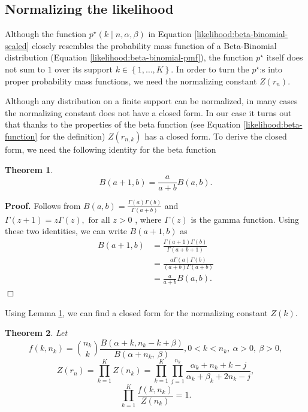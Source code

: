 \documentclass[officiallayout]{tktla}
\newtheorem{theorem}{Theorem}[chapter]
\newenvironment{proof}{\noindent\textbf{Proof.} }{$\Box$}
\begin{document}
\subsection{Normalizing the likelihood}

Although the function $p^{\star}\left(k \middle| n, \alpha,
\beta\right)$ in Equation \ref{likelihood:beta-binomial-scaled}
closely resembles the probability mass function of a Beta-Binomial
distribution (Equation \ref{likelihood:beta-binomial-pmf}), the
function $p^{\star}$ itself does not sum to $1$ over its support $k
\in \left\{ 1, \dots, K \right\}$. In order to turn the $p^{\star}$:s
into proper probability mass functions, we need the normalizing
constant $Z\left(r_{n}\right)$.

Although any distribution on a finite support can be normalized, in
many cases the normalizing constant does not have a closed form. In
our case it turns out that \textemdash thanks to the properties of the
beta function (see Equation \ref{likelihood:beta-function} for the
definition) \textemdash $Z\left(r_{n, k}\right)$ has a closed form. To
derive the closed form, we need the following identity for the beta
function
\begin{theorem}
  \label{lemma:beta-function-identity}
  \[
  B\left(a + 1, b\right) = \frac{a}{a + b}B\left(a, b\right).
  \]
\end{theorem}

\begin{proof}
  Follows from $B\left(a, b\right) = \frac{\Gamma\left(a\right)\Gamma\left(b\right)}{\Gamma\left(a + b\right)}$ \citep{artin_einfuhrung} and $\Gamma\left(z + 1\right) = z\Gamma\left(z\right), \text{ for all } z > 0$ \citep{davis_leonhard}, where $\Gamma\left(z\right)$ is the gamma function. Using these two identities, we can write $B\left(a + 1, b\right)$ as
  \begin{align*}
    B\left(a + 1, b\right) &= \frac{\Gamma\left(a + 1\right)\Gamma\left(b\right)}{\Gamma\left(a + b + 1\right)} \\
    &= \frac{a\Gamma\left(a\right)\Gamma\left(b\right)}{\left(a + b\right)\Gamma\left(a + b\right)} \\
    &= \frac{a}{a + b}B\left(a, b\right).
  \end{align*}
\end{proof}

Using Lemma \ref{lemma:beta-function-identity}, we can find a closed form for the normalizing constant $Z\left(k\right)$.
\begin{theorem}
  \label{theorem:likelihood-can-be-normalized}
  Let
  \[
  f\left(k, n_{k}\right) = \binom{n_{k}}{k}\frac{B\left(\alpha + k, n_{k} - k + \beta\right)}{B\left(\alpha + n_{k}, \: \beta\right)}, 0 < k < n_{k}, \: \alpha > 0, \: \beta > 0,
  \]
  \[
  Z\left(r_{n}\right) = \prod_{k = 1}^{K}Z\left(n_{k}\right) = \prod_{k = 1}^{K}\prod_{j = 1}^{n_{k}}\frac{\alpha_{k} + n_{k} + k - j}{\alpha_{k} + \beta_{k} + 2n_{k} - j},
  \]
  \[
  \prod_{k = 1}^{K} \frac{f\left(k, n_{k}\right)}{Z\left(n_{k}\right)} = 1.
  \]
\end{theorem}
\end{document}
